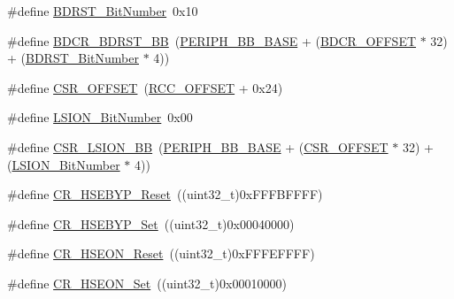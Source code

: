 \begin{DoxyCompactItemize}
\#define \hyperlink{group___r_c_c___private___defines_gae6718158034388d8fde8caaa28ffe8b9}{B\+D\+R\+S\+T\+\_\+\+Bit\+Number}~0x10
\item 
\#define \hyperlink{group___r_c_c___private___defines_ga892fdf297b85b85cbaf0723649b31818}{B\+D\+C\+R\+\_\+\+B\+D\+R\+S\+T\+\_\+\+BB}~(\hyperlink{group___peripheral__memory__map_gaed7efc100877000845c236ccdc9e144a}{P\+E\+R\+I\+P\+H\+\_\+\+B\+B\+\_\+\+B\+A\+SE} + (\hyperlink{group___r_c_c___private___defines_ga5f8a0c3cb5f5c835bf7eef09515138ad}{B\+D\+C\+R\+\_\+\+O\+F\+F\+S\+ET} $\ast$ 32) + (\hyperlink{group___r_c_c___private___defines_gae6718158034388d8fde8caaa28ffe8b9}{B\+D\+R\+S\+T\+\_\+\+Bit\+Number} $\ast$ 4))
\item 
\#define \hyperlink{group___r_c_c___private___defines_ga984cbe73312b6d3d355c5053763d499a}{C\+S\+R\+\_\+\+O\+F\+F\+S\+ET}~(\hyperlink{group___r_c_c___private___defines_ga539e07c3b3c55f1f1d47231341fb11e1}{R\+C\+C\+\_\+\+O\+F\+F\+S\+ET} + 0x24)
\item 
\#define \hyperlink{group___r_c_c___private___defines_ga3f9dbe50769ce2a63ae12520433b9b40}{L\+S\+I\+O\+N\+\_\+\+Bit\+Number}~0x00
\item 
\#define \hyperlink{group___r_c_c___private___defines_gaa253e36e7e5fb02998c0e4d0388abc52}{C\+S\+R\+\_\+\+L\+S\+I\+O\+N\+\_\+\+BB}~(\hyperlink{group___peripheral__memory__map_gaed7efc100877000845c236ccdc9e144a}{P\+E\+R\+I\+P\+H\+\_\+\+B\+B\+\_\+\+B\+A\+SE} + (\hyperlink{group___r_c_c___private___defines_ga984cbe73312b6d3d355c5053763d499a}{C\+S\+R\+\_\+\+O\+F\+F\+S\+ET} $\ast$ 32) + (\hyperlink{group___r_c_c___private___defines_ga3f9dbe50769ce2a63ae12520433b9b40}{L\+S\+I\+O\+N\+\_\+\+Bit\+Number} $\ast$ 4))
\item 
\#define \hyperlink{group___r_c_c___private___defines_ga98f5ef520febdb0a1cd8f407f8e5e62f}{C\+R\+\_\+\+H\+S\+E\+B\+Y\+P\+\_\+\+Reset}~((uint32\+\_\+t)0x\+F\+F\+F\+B\+F\+F\+F\+F)
\item 
\#define \hyperlink{group___r_c_c___private___defines_ga84972845ff646ce1d3902d54dd7b9bc6}{C\+R\+\_\+\+H\+S\+E\+B\+Y\+P\+\_\+\+Set}~((uint32\+\_\+t)0x00040000)
\item 
\#define \hyperlink{group___r_c_c___private___defines_ga8185e6ea6e9abafcdee0e5f58e62805e}{C\+R\+\_\+\+H\+S\+E\+O\+N\+\_\+\+Reset}~((uint32\+\_\+t)0x\+F\+F\+F\+E\+F\+F\+F\+F)
\item 
\#define \hyperlink{group___r_c_c___private___defines_gaca6ef9e2f11b921355809a5eccfec864}{C\+R\+\_\+\+H\+S\+E\+O\+N\+\_\+\+Set}~((uint32\+\_\+t)0x00010000)
\item 

\end{DoxyCompactItemize}
